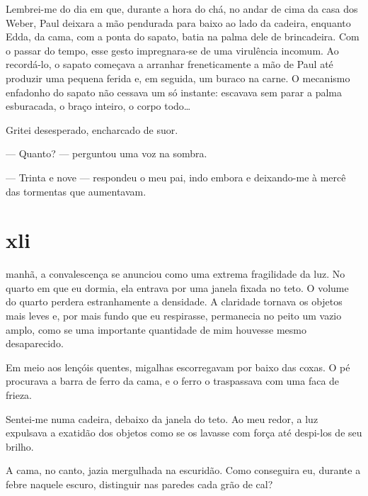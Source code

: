 Lembrei-me do dia em que, durante a hora do chá, no andar de cima da casa dos
Weber, Paul deixara a mão pendurada para baixo ao lado da cadeira, enquanto
Edda, da cama, com a ponta do sapato, batia na palma dele de brincadeira. Com
o passar do tempo, esse gesto impregnara-se de uma virulência incomum. Ao
recordá-lo, o sapato começava a arranhar freneticamente a mão de Paul até
produzir uma pequena ferida e, em seguida, um buraco na carne. O mecanismo
enfadonho do sapato não cessava um só instante: escavava sem parar a palma
esburacada, o braço inteiro, o corpo todo\ldots{}


Gritei desesperado, encharcado de suor.

--- Quanto? --- perguntou uma voz na sombra.

--- Trinta e nove --- respondeu o meu pai, indo embora e deixando-me à mercê
    das tormentas que aumentavam.


\section{xli} 

 manhã, a convalescença se anunciou como uma extrema fragilidade
 da luz. No quarto em que eu dormia, ela entrava por uma janela fixada no
 teto. O volume do quarto perdera estranhamente a densidade. A claridade
 tornava os objetos mais leves e, por mais fundo que eu respirasse,
 permanecia no peito um vazio amplo, como se uma importante quantidade de mim
 houvesse mesmo desaparecido.

Em meio aos lençóis quentes, migalhas escorregavam por baixo das coxas. O pé
procurava a barra de ferro da cama, e o ferro o traspassava com uma faca de
frieza.


Sentei-me numa cadeira, debaixo da janela do teto. Ao meu redor, a luz
expulsava a exatidão dos objetos como se os lavasse com força até despi-los
de seu brilho.

A cama, no canto, jazia mergulhada na escuridão. Como conseguira eu, durante a
febre naquele escuro, distinguir nas paredes cada grão de cal?


